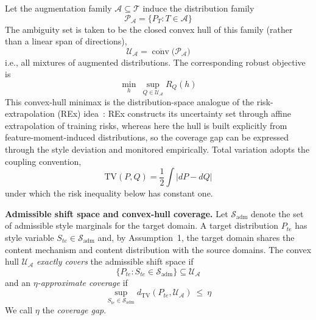 \documentclass[electronics,article,submit,moreauthors]{Definitions/mdpi}
\begin{document}
Let the augmentation family $\mathcal{A}\subseteq\mathcal{T}$ induce the distribution family
\begin{equation}
\mathcal{P}_{\mathcal{A}}=\big\{P_T:T\in\mathcal{A}\big\}
\end{equation}
The ambiguity set is taken to be the closed convex hull of this family (rather than a linear span of directions),
\begin{equation}
\mathcal{U}_{\mathcal{A}}=\overline{\operatorname{conv}}\big(\mathcal{P}_{\mathcal{A}}\big)
\end{equation}
i.e., all mixtures of augmented distributions. The corresponding robust objective is
\begin{equation}
\min_h\ \sup_{Q\in\mathcal{U}_{\mathcal{A}}}R_Q(h)
\end{equation}
This convex-hull minimax is the distribution-space analogue of the risk-extrapolation (REx) idea~\citep{ref43}: REx constructs its uncertainty set through affine extrapolation of training risks, whereas here the hull is built explicitly from feature-moment-induced distributions, so the coverage gap can be expressed through the style deviation and monitored empirically. Total variation adopts the coupling convention,
\begin{equation}
\mathrm{TV}(P,Q)=\frac{1}{2}\int\left|dP-dQ\right|
\end{equation}
under which the risk inequality below has constant one.

\noindent\textbf{Admissible shift space and convex-hull coverage.} Let $\mathcal{S}_{\mathrm{adm}}$ denote the set of admissible style marginals for the target domain. A target distribution $P_{te}$ has style variable $S_{te}\in\mathcal{S}_{\mathrm{adm}}$ and, by Assumption~1, the target domain shares the content mechanism and content distribution with the source domains. The convex hull $\mathcal{U}_{\mathcal{A}}$ \emph{exactly covers} the admissible shift space if
\begin{equation}
\{P_{te}:S_{te}\in\mathcal{S}_{\mathrm{adm}}\}\subseteq\mathcal{U}_{\mathcal{A}}
\end{equation}
and an \emph{$\eta$-approximate coverage} if
\begin{equation}
\sup_{S_{te}\in\mathcal{S}_{\mathrm{adm}}} d_{\mathrm{TV}}(P_{te},\mathcal{U}_{\mathcal{A}})\ \le\ \eta
\end{equation}
We call $\eta$ the \emph{coverage gap}.
\end{document}
